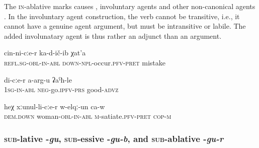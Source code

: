 The \textsc{in}-ablative marks causes , involuntary agents  and other non-canonical agents . In the involuntary agent construction, the verb cannot be transitive, i.e., it cannot have a genuine agent argument, but must be intransitive or labile. The added involunatary agent is thus rather an adjunct than an argument.
%
\begin{exe}
	\ex	\label{the mistakes that he made that happened through him}
	\gll	cin-ni-cːe-r	ka-d-ič-ib	χat'a \\
		\textsc{refl}.\textsc{sg}-\textsc{obl-in}-\textsc{abl}	\textsc{down}-\textsc{npl}-occur.\textsc{pfv}-\textsc{pret} mistake\\
	\glt	{}
	
	\ex	\label{I cannot do it well (lit. it will not go well from me}
	\gll	di-cːe-r	a-arg-u	ʡaˁħ-le \\
		1\textsc{sg-in}-\textsc{abl}	\textsc{neg}-go.\textsc{ipfv}-\textsc{prs}	good-\textsc{advz}\\
	\glt	{}
	
	\ex	\label{He had enough of his wife}
	\gll	heχ	xːunul-li-cːe-r	w-elqː-un ca-w \\
		\textsc{dem.down}	woman-\textsc{obl-in}-\textsc{abl}	\textsc{m}-satiate.\textsc{pfv}-\textsc{pret} \textsc{cop-m}\\
	\glt	{}
\end{exe}



\subsubsection{\textsc{sub}-lative -\textit{gu}, \textsc{sub}-essive -\textit{gu-b}, and \textsc{sub}-ablative -\textit{gu-r}}
\label{sssec:sub-lative -gu, sub-essive -gu-b, and sub-ablative -gu-r}

